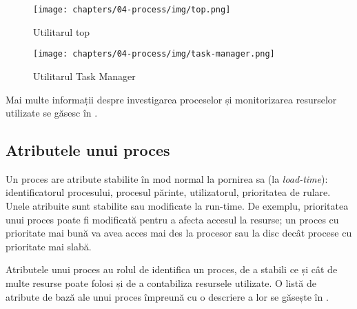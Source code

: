 \begin{figure}[!htbp]
  \centering
  \texttt{[image: chapters/04-process/img/top.png]}
  \caption{Utilitarul top}
  \label{fig:process:top}
\end{figure}

\begin{figure}[!htbp]
  \centering
  \texttt{[image: chapters/04-process/img/task-manager.png]}
  \caption{Utilitarul Task Manager}
  \label{fig:process:task-manager}
\end{figure}

Mai multe informații despre investigarea proceselor și monitorizarea resurselor utilizate se găsesc în .

\subsection{Atributele unui proces}
\label{sec:process:attributes}

Un proces are atribute stabilite în mod normal la pornirea sa (la \textit{load-time}): identificatorul procesului, procesul părinte, utilizatorul, prioritatea de rulare.
Unele atribuite sunt stabilite sau modificate la run-time.
De exemplu, prioritatea unui proces poate fi modificată pentru a afecta accesul la resurse;
un proces cu prioritate mai bună va avea acces mai des la procesor sau la disc decât procese cu prioritate mai slabă.

Atributele unui proces au rolul de identifica un proces, de a stabili ce și cât de multe resurse poate folosi și de a contabiliza resursele utilizate.
O listă de atribute de bază ale unui proces împreună cu o descriere a lor se găsește în .

